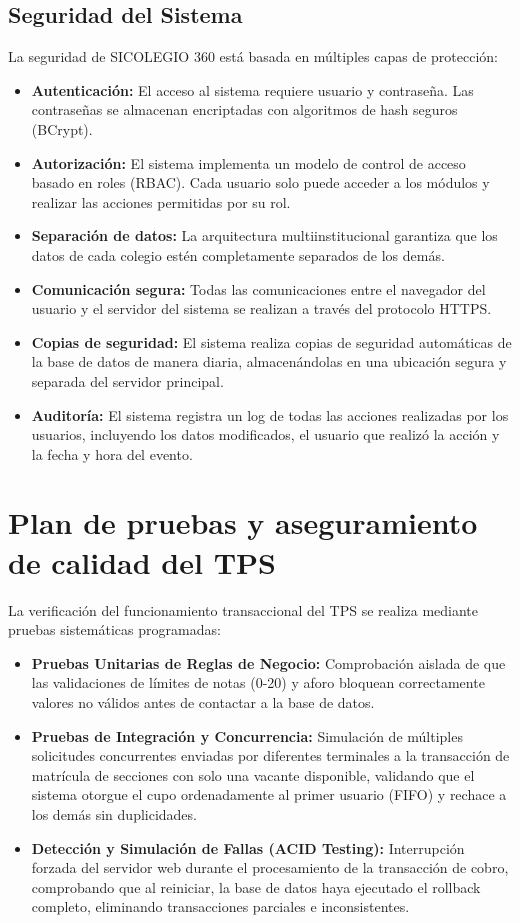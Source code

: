 \documentclass[12pt,a4paper,oneside]{report}
\begin{document}
\subsection{Seguridad del Sistema}
La seguridad de SICOLEGIO 360 está basada en múltiples capas de protección:
\begin{itemize}
  \item \textbf{Autenticación:} El acceso al sistema requiere usuario y contraseña. Las contraseñas se almacenan encriptadas con algoritmos de hash seguros (BCrypt).
  \item \textbf{Autorización:} El sistema implementa un modelo de control de acceso basado en roles (RBAC). Cada usuario solo puede acceder a los módulos y realizar las acciones permitidas por su rol.
  \item \textbf{Separación de datos:} La arquitectura multiinstitucional garantiza que los datos de cada colegio estén completamente separados de los demás.
  \item \textbf{Comunicación segura:} Todas las comunicaciones entre el navegador del usuario y el servidor del sistema se realizan a través del protocolo HTTPS.
  \item \textbf{Copias de seguridad:} El sistema realiza copias de seguridad automáticas de la base de datos de manera diaria, almacenándolas en una ubicación segura y separada del servidor principal.
  \item \textbf{Auditoría:} El sistema registra un log de todas las acciones realizadas por los usuarios, incluyendo los datos modificados, el usuario que realizó la acción y la fecha y hora del evento.
\end{itemize}

\section{Plan de pruebas y aseguramiento de calidad del TPS}

La verificación del funcionamiento transaccional del TPS se realiza mediante pruebas sistemáticas programadas:
\begin{itemize}
    \item \textbf{Pruebas Unitarias de Reglas de Negocio:} Comprobación aislada de que las validaciones de límites de notas (0-20) y aforo bloquean correctamente valores no válidos antes de contactar a la base de datos.
    \item \textbf{Pruebas de Integración y Concurrencia:} Simulación de múltiples solicitudes concurrentes enviadas por diferentes terminales a la transacción de matrícula de secciones con solo una vacante disponible, validando que el sistema otorgue el cupo ordenadamente al primer usuario (FIFO) y rechace a los demás sin duplicidades.
    \item \textbf{Detección y Simulación de Fallas (ACID Testing):} Interrupción forzada del servidor web durante el procesamiento de la transacción de cobro, comprobando que al reiniciar, la base de datos haya ejecutado el rollback completo, eliminando transacciones parciales e inconsistentes.
\end{itemize}
\end{document}
